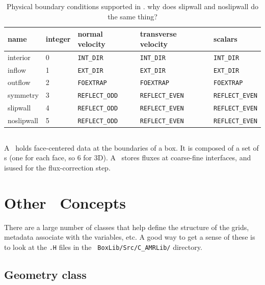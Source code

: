 \begin{table}
\renewcommand{\arraystretch}{1.5}
\centering
\begin{tabular}{lllll}
{\bf name} & {\bf integer} & {\bf normal velocity} & {\bf transverse velocity} & {\bf scalars} \\
\hline
interior & 0 & {\tt INT\_DIR} & {\tt INT\_DIR} & {\tt INT\_DIR} \\
inflow   & 1 & {\tt EXT\_DIR} & {\tt EXT\_DIR} & {\tt EXT\_DIR} \\
outflow  & 2 & {\tt FOEXTRAP} & {\tt FOEXTRAP} & {\tt FOEXTRAP} \\
symmetry & 3 & {\tt REFLECT\_ODD} & {\tt REFLECT\_EVEN} & {\tt REFLECT\_EVEN} \\
slipwall & 4 & {\tt REFLECT\_ODD} & {\tt REFLECT\_EVEN} & {\tt REFLECT\_EVEN} \\
noslipwall & 5 & {\tt REFLECT\_ODD} & {\tt REFLECT\_EVEN} & {\tt REFLECT\_EVEN} \\
\hline
\end{tabular}
\caption[Physics boundary conditions in \castro]
  {\label{table:castro:bcs} Physical boundary conditions supported in \castro.  {\color{red} why does slipwall and noslipwall do the same thing?}}
\renewcommand{\arraystretch}{1.0}
\end{table}


\subsection{\fluxregister}

A \fluxregister\ holds face-centered data at the boundaries of a box.
It is composed of a set of \multifab s (one for each face, so 6 for
3D).  A \fluxregister\ stores fluxes at coarse-fine interfaces, 
and isused for the flux-correction step.



\section{Other \boxlib\ Concepts}

There are a large number of classes that help define the structure of
the grids, metadata associate with the variables, etc.  A good way to
get a sense of these is to look at the {\tt .H} files in the {\tt
  BoxLib/Src/C\_AMRLib/} directory.

\subsection{Geometry class}

